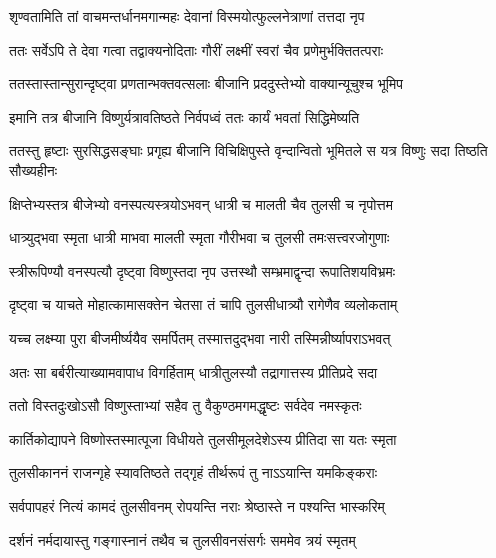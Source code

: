\twolineshloka
{शृण्वतामिति तां वाचमन्तर्धानमगान्महः}
{देवानां विस्मयोत्फुल्लनेत्राणां तत्तदा नृप} %

\twolineshloka
{ततः सर्वेऽपि ते देवा गत्वा तद्वाक्यनोदिताः}
{गौरीं लक्ष्मीं स्वरां चैव प्रणेमुर्भक्तितत्पराः} %

\twolineshloka
{ततस्तास्तान्सुरान्दृष्ट्वा प्रणतान्भक्तवत्सलाः}
{बीजानि प्रददुस्तेभ्यो वाक्यान्यूचुश्च भूमिप} %


\twolineshloka
{इमानि तत्र बीजानि विष्णुर्यत्रावतिष्ठते}
{निर्वपध्वं ततः कार्यं भवतां सिद्धिमेष्यति} %

\twolineshloka
{ततस्तु हृष्टाः सुरसिद्धसङ्घाः प्रगृह्य बीजानि विचिक्षिपुस्ते}
{वृन्दान्वितो भूमितले स यत्र विष्णुः सदा तिष्ठति सौख्यहीनः} %





\twolineshloka
{क्षिप्तेभ्यस्तत्र बीजेभ्यो वनस्पत्यस्त्रयोऽभवन्}
{धात्री च मालती चैव तुलसी च नृपोत्तम} %

\twolineshloka
{धात्र्युद्भवा स्मृता धात्री माभवा मालती स्मृता}
{गौरीभवा च तुलसी तमःसत्त्वरजोगुणाः} %

\twolineshloka
{स्त्रीरूपिण्यौ वनस्पत्यौ दृष्ट्वा विष्णुस्तदा नृप}
{उत्तस्थौ सम्भ्रमाद्वृन्दा रूपातिशयविभ्रमः} %

\twolineshloka
{दृष्ट्वा च याचते मोहात्कामासक्तेन चेतसा}
{तं चापि तुलसीधात्र्यौ रागेणैव व्यलोकताम्} %

\twolineshloka
{यच्च लक्ष्म्या पुरा बीजमीर्ष्ययैव समर्पितम्}
{तस्मात्तदुद्भवा नारी तस्मिन्नीर्ष्यापराऽभवत्} %

\twolineshloka
{अतः सा बर्बरीत्याख्यामवापाध विगर्हिताम्}
{धात्रीतुलस्यौ तद्रागात्तस्य प्रीतिप्रदे सदा} %

\twolineshloka
{ततो विस्तदुःखोऽसौ विष्णुस्ताभ्यां सहैव तु}
{वैकुण्ठमगमद्धृष्टः सर्वदेव नमस्कृतः} %

\twolineshloka
{कार्तिकोद्यापने विष्णोस्तस्मात्पूजा विधीयते}
{तुलसीमूलदेशेऽस्य प्रीतिदा सा यतः स्मृता} %

\twolineshloka
{तुलसीकाननं राजन्गृहे स्यावतिष्ठते}
{तद्गृहं तीर्थरूपं तु नाऽऽयान्ति यमकिङ्कराः} %

\twolineshloka
{सर्वपापहरं नित्यं कामदं तुलसीवनम्}
{रोपयन्ति नराः श्रेष्ठास्ते न पश्यन्ति भास्करिम्} %

\twolineshloka
{दर्शनं नर्मदायास्तु गङ्गास्नानं तथैव च}
{तुलसीवनसंसर्गः सममेव त्रयं स्मृतम्} %

